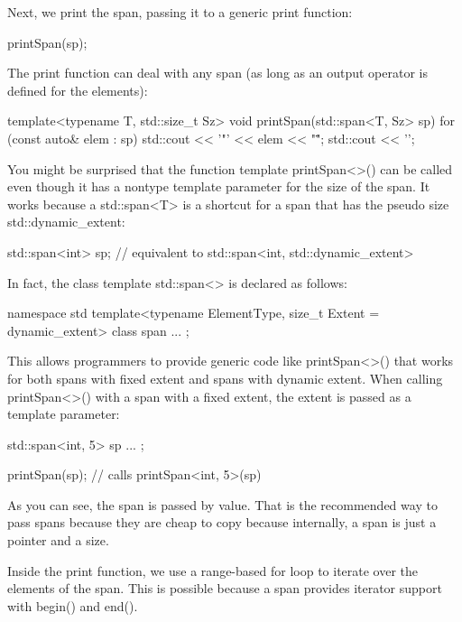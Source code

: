 
Next, we print the span, passing it to a generic print function:

\begin{cpp}
printSpan(sp);
\end{cpp}

The print function can deal with any span (as long as an output operator is defined for the elements):

\begin{cpp}
template<typename T, std::size_t Sz>
void printSpan(std::span<T, Sz> sp)
{
	for (const auto& elem : sp) {
		std::cout << '"' << elem << "\" ";
	}
	std::cout << '\n';
}
\end{cpp}

You might be surprised that the function template printSpan<>() can be called even though it has a nontype template parameter for the size of the span. It works because a std::span<T> is a shortcut for a span that has the pseudo size std::dynamic\_extent:

\begin{cpp}
std::span<int> sp; // equivalent to std::span<int, std::dynamic_extent>
\end{cpp}

In fact, the class template std::span<> is declared as follows:

\begin{cpp}
namespace std {
	template<typename ElementType, size_t Extent = dynamic_extent>
	class span {
		...
	};
}
\end{cpp}

This allows programmers to provide generic code like printSpan<>() that works for both spans with fixed extent and spans with dynamic extent. When calling printSpan<>() with a span with a fixed extent, the extent is passed as a template parameter:

\begin{cpp}
std::span<int, 5> sp{ ... };

printSpan(sp); // calls printSpan<int, 5>(sp)
\end{cpp}

As you can see, the span is passed by value. That is the recommended way to pass spans because they are cheap to copy because internally, a span is just a pointer and a size.

Inside the print function, we use a range-based for loop to iterate over the elements of the span. This is possible because a span provides iterator support with begin() and end().

